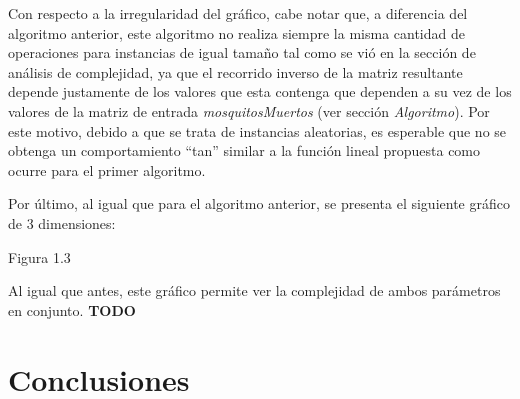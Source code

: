 \documentclass[a4paper,11pt] {article}
\begin{document}
Con respecto a la irregularidad del gráfico, cabe notar que, a diferencia del algoritmo anterior, este algoritmo no realiza siempre la misma cantidad de operaciones para instancias de igual tamaño tal como se vió en la sección de análisis de complejidad, ya que el recorrido inverso de la matriz resultante depende justamente de los valores que esta contenga que dependen a su vez de los valores de la matriz de entrada \textit{mosquitosMuertos} (ver sección \textit{Algoritmo}). Por este motivo, debido a que se trata de instancias aleatorias, es esperable que no se obtenga un comportamiento ``tan'' similar a la función lineal propuesta como ocurre para el primer algoritmo.

Por último, al igual que para el algoritmo anterior, se presenta el siguiente gráfico de 3 dimensiones:

\begin{center}
Figura 1.3
\end{center}

Al igual que antes, este gráfico permite ver la complejidad de ambos parámetros en conjunto. \textbf{TODO}

\section*{Conclusiones}


% 
% 
\end{document}
